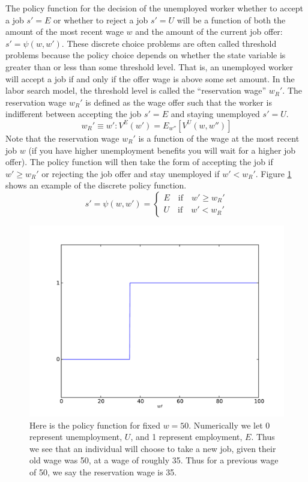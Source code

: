 The policy function for the decision of the unemployed worker whether to accept a job $s'=E$ or whether to reject a job $s'=U$ will be a function of both the amount of the most recent wage $w$ and the amount of the current job offer: $s' = \psi(w,w')$. These discrete choice problems are often called threshold problems because the policy choice depends on whether the state variable is greater than or less than some threshold level. That is, an unemployed worker will accept a job if and only if the offer wage is above some set amount. In the labor search model, the threshold level is called the ``reservation wage'' $w_R'$. The reservation wage $w_R'$ is defined as the wage offer such that the worker is indifferent between accepting the job $s' = E$ and staying unemployed $s' = U$.
\begin{equation}\label{EqWR}
   w_R' \equiv w': V^E(w') = E_{w''}\left[V^U(w,w'')\right]
\end{equation}
Note that the reservation wage $w_R'$ is a function of the wage at the most recent job $w$ (if you have higher unemployment benefits you will wait for a higher job offer). The policy function will then take the form of accepting the job if $w' \geq w_R'$ or rejecting the job offer and stay unemployed if $w' < w_R'$.  Figure \ref{fig:disc_policy} shows an example of the discrete policy function.
\begin{equation}\label{EqSprime}
   s' = \psi(w,w') = \begin{cases}
                      E \quad\text{if}\quad w' \geq w_R' \\
                      U \quad\text{if}\quad w' < w_R'
                   \end{cases}
\end{equation}

\begin{figure}
\centering
    \includegraphics[width=\textwidth]{disc_policy.pdf}
    \caption{Here is the policy function for fixed $w = 50$.  Numerically we let 0 represent unemployment, $U$, and 1 represent employment, $E$.  Thus we see that an individual will choose to take a new job, given their old wage was 50, at a wage of roughly 35.  Thus for a previous wage of 50, we say the reservation wage is 35.}
    \label{fig:disc_policy}
\end{figure}

